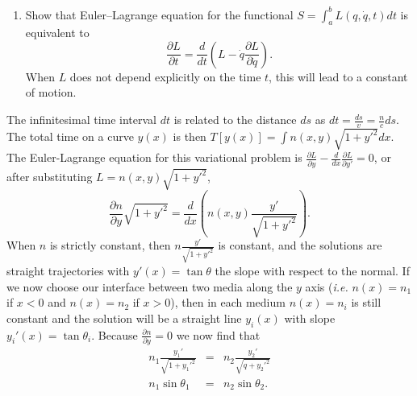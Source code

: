 \documentclass[letterpaper,11pt]{article}
\begin{document}
\begin{enumerate}[resume]
 \item Show that Euler--Lagrange equation for the functional $S = \int_a^b L(q,\dot{q},t) dt$ is equivalent to
  \begin{equation}
   \frac{\partial L}{\partial t} = \frac{d}{dt} \left( L - \dot{q} \frac{\partial L}{\partial \dot{q}} \right).
  \end{equation}
 When $L$ does not depend explicitly on the time $t$, this will lead to a constant of motion.
\end{enumerate}
The infinitesimal time interval $dt$ is related to the distance $ds$ as $dt = \frac{ds}{v} = \frac{n}{c} ds$.  The total time on a curve $y(x)$ is then $T[y(x)] = \int n(x,y) \sqrt{1 + y'^2} dx$.  The Euler-Lagrange equation for this variational problem is $\frac{\partial L}{\partial y} - \frac{d}{dx} \frac{\partial L}{\partial y'} = 0$, or after substituting $L = n(x,y) \sqrt{1 + y'^2}$,
\begin{equation*}
 \frac{\partial n}{\partial y} \sqrt{1 + y'^2} = \frac{d}{dx} \left( n(x,y) \frac{y'}{\sqrt{1 + y'^2}} \right).
\end{equation*}
When $n$ is strictly constant, then $n \frac{y'}{\sqrt{1 + y'^2}}$ is constant, and the solutions are straight trajectories with $y'(x) = \tan\theta$ the slope with respect to the normal.  If we now choose our interface between two media along the $y$ axis (\textit{i.e.} $n(x) = n_1$ if $x < 0$ and $n(x) = n_2$ if $x > 0$), then in each medium $n(x) = n_i$ is still constant and the solution will be a straight line $y_i(x)$ with slope $y_i'(x) = \tan\theta_i$.  Because $\frac{\partial n}{\partial y} = 0$ we now find that
\begin{eqnarray*}
 n_1 \frac{y_1'}{\sqrt{1 + y_1'^2}} & = & n_2 \frac{y_2'}{\sqrt{q + y_2'^2}} \\
 n_1 \sin\theta_1 & = & n_2 \sin\theta_2.
\end{eqnarray*}
\end{document}
